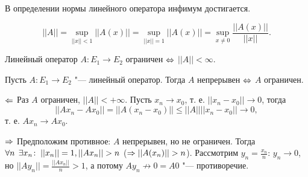 \documentclass[main]{subfiles}
\begin{document}
\begin{exercise}
  В определении нормы линейного оператора инфимум достигается.
\end{exercise}

\begin{lemma}
  \[ ||A|| = \sup_{||x|| < 1} ||A(x)|| = \sup_{||x|| = 1} ||A(x)|| =
  \sup_{x \ne 0} \frac{||A(x)||}{||x||}. \]
\end{lemma}
\begin{corollary}
  Линейный оператор \( A : E_1 \to E_2 \)
  ограничен \( \Leftrightarrow \) \( ||A|| < \infty \).
\end{corollary}

\begin{theorem}
  Пусть \( A : E_1 \to E_2 \) "---
  линейный оператор. Тогда \( A \) непрерывен \( \Leftrightarrow \)
  \( A \) ограничен.
\end{theorem}
\begin{itemproof}
  \item[\(\Leftarrow\)]
    Раз \( A \) ограничен, \( ||A|| < +\infty \).
    Пусть \( x_n \to x_0 \), т. е. \( ||x_n - x_0|| \to 0 \),
    тогда
    \[
      ||A x_n - A x_0|| = ||A(x_n - x_0)|| \le ||A|| ||x_n - x_0|| \to 0,
    \]
    т. е. \( A x_n \to A x_0 \).
  \item[$\Rightarrow$]
    Предположим противное: \( A \) непрерывен, но не ограничен.
    Тогда \( \forall {n} \; \, \exists x_n \colon \: ||x_n|| = 1, ||A x_n|| > n \)
    (\( \Rightarrow ||A(x_n)|| > n \)).
    Рассмотрим \( y_n = \frac{x_n}{n} \):
    \( y_n \to 0 \), но \( ||A y_n|| = \frac{||A x_n||}{n} > 1 \),
    а потому \( A y_n \not \to 0 = A 0 \) "--- противоречие.
\end{itemproof}
\end{document}
